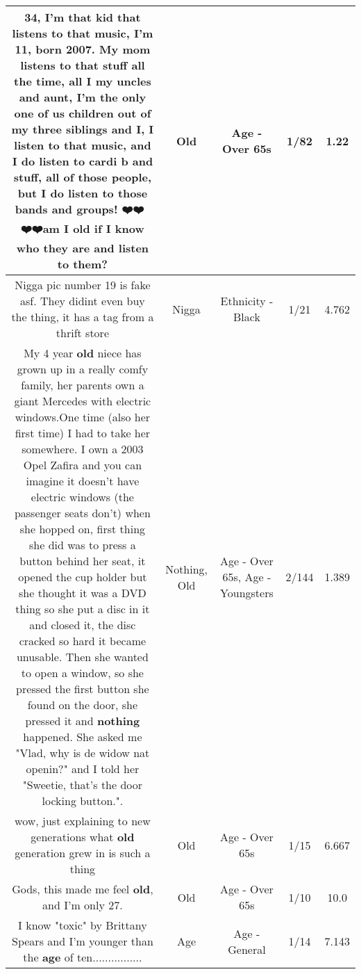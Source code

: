 \documentclass[11pt]{article}
\newlength\mylength
\begin{document}
\begin{center}
\begin{longtable}{|C{.65\mylength}|C{.30\mylength}|C{.12\mylength}|C{.12\mylength}|C{.12\mylength}|}
  \small 34, I'm that kid that listens to that music, I'm 11, born 2007. My mom listens to that stuff all the time, all I my uncles and aunt, I'm the only one of us children out of my three siblings and I, I listen to that music, and I do listen to cardi b and stuff, all of those people, but I do listen to those bands and groups! ❤️❤️🤣🤣❤️❤️am I \textbf{old} if I know who they are and listen to them?\normalsize   & Old & Age - Over 65s & 1/82 & 1.22 \\  \hline
  \small Nigga pic number 19 is fake asf. They didint even buy the thing, it has a tag from a thrift store\normalsize   & Nigga & Ethnicity - Black & 1/21 & 4.762 \\  \hline
  \small My 4 year \textbf{old} niece has grown up in a really comfy family, her parents own a giant Mercedes with electric windows.One time (also her first time) I had to take her somewhere. I own a 2003 Opel Zafira and you can imagine it doesn't have electric windows (the passenger seats don't) when she hopped on, first thing she did was to press a button behind her seat, it opened the cup holder but she thought it was a DVD thing so she put a disc in it and closed it, the disc cracked so hard it became unusable. Then she wanted to open a window, so she pressed the first button she found on the door, she pressed it and \textbf{nothing} happened. She asked me "Vlad, why is de widow nat openin?" and I told her "Sweetie, that's the door locking button.".\normalsize   & Nothing, Old & Age - Over 65s, Age - Youngsters & 2/144 & 1.389 \\  \hline
  \small wow, just explaining to new generations what \textbf{old} generation grew in is such a thing\normalsize   & Old & Age - Over 65s & 1/15 & 6.667 \\  \hline
  \small Gods, this made me feel \textbf{old}, and I'm only 27.\normalsize   & Old & Age - Over 65s & 1/10 & 10.0 \\  \hline
  \small I know "toxic" by Brittany Spears and I'm younger than the \textbf{age} of ten................\normalsize   & Age & Age - General & 1/14 & 7.143 \\  \hline

\end{longtable}
\end{center}
\end{document}
